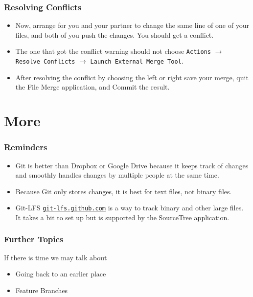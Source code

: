 \documentclass[12pt, compress,xcolor={usenames,dvipsnames}]{beamer} %
\begin{document}
\begin{frame}\frametitle{Resolving Conflicts}
	\vspace{-4ex}
	
	\begin{itemize}
		
		
		\item Now, arrange for you and your partner to change the same line of one of your files, and both of you push the changes.  You should get a \alert{conflict}.
		
		\item The one that got the conflict warning should not choose \texttt{Actions} $\rightarrow$ \texttt{Resolve Conflicts} $\rightarrow$ \texttt{Launch External Merge Tool}.
		
		\item After resolving the conflict by choosing the left or right \alert{save} your merge, \alert{quit} the File Merge application, and \alert{Commit} the result.
				
		
	\end{itemize}
	
\end{frame}

\section{More}

\begin{frame}\frametitle{Reminders}
	
	\begin{itemize}
		
		
		\item Git is better than Dropbox or Google Drive because it keeps track of changes and smoothly handles changes by multiple people at the same time.
		
		
		\item Because Git only stores changes, it is best for text files, not binary files.  
		
		\item Git-LFS \href{https://git-lfs.github.com}{\nolinkurl{git-lfs.github.com}}  is a way to track binary and other large files.  It takes a bit to set up but is supported by the SourceTree application.  
		
		
		
	\end{itemize}
	
\end{frame}

\begin{frame}\frametitle{Further Topics}
	If there is time we may talk about
	
	\begin{itemize}
		
		
		\item Going back to an earlier place
		
		\item Feature Branches
		
		
		
	\end{itemize}
	
\end{frame}
\end{document}

